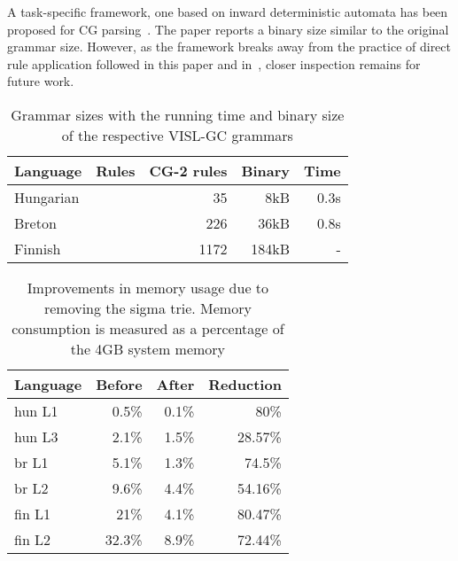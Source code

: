 \documentclass{article}
\begin{document}
A task-specific framework, one based on inward deterministic automata has
been proposed for CG parsing~\cite{Yli-Jyra:2011}. The paper reports a binary
size similar to the original grammar size. However, as the framework breaks away
from the practice of direct rule application followed in this paper and
in~\cite{Hulden:2011,Peltonen:2011}, closer inspection remains for future work. 


\begin{table*}[h]
  \centering
  \caption{Grammar sizes with the running time and binary size of the respective
           VISL-GC grammars}
  \label{tab:grammar_size}
  \begin{tabular}{ | l | r | r | r | r | }
  \hline
  \textbf{Language} & \textbf{Rules} & \textbf{CG-2 rules} &
  \textbf{Binary} & \textbf{Time} \\
  \hline
  Hungarian & &   35 &   8kB & 0.3s \\
  Breton    & &  226 &  36kB & 0.8s \\
  Finnish   & & 1172 & 184kB & - \\    %
  \hline
  \end{tabular}
\end{table*}

\begin{table}[h]
  \centering
  \caption{Improvements in memory usage due to removing the sigma trie. Memory
           consumption is measured as a percentage of the 4GB system memory}
  \label{tab:sigma_memory}
  \begin{tabular}{ | l | r | r | r | }
  \hline
  \textbf{Language} & \textbf{Before} & \textbf{After} & \textbf{Reduction} \\
  \hline
  hun L1 & 0.5\% & 0.1\% & 80\% \\
  hun L3 & 2.1\% & 1.5\% & 28.57\% \\
  br L1 & 5.1\% & 1.3\% & 74.5\% \\
  br L2 & 9.6\% & 4.4\% & 54.16\% \\
  fin L1 & 21\% & 4.1\% & 80.47\% \\
  fin L2 & 32.3\% & 8.9\% & 72.44\% \\
  \hline
  \end{tabular}
\end{table}
\end{document}
